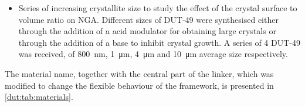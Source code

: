 \begin{itemize}
    \item Series of increasing crystallite size to study the effect 
    of the crystal surface to volume ratio on NGA. Different sizes
    of DUT-49 were synthesised either through the addition of a 
    acid modulator for obtaining large crystals or through the addition
    of a base to inhibit crystal growth. A series of 4 DUT-49 
    was received, of \SI{800}{\nano\metre}, \SI{1}{\micro\metre},
    \SI{4}{\micro\metre} and \SI{10}{\micro\metre} average size 
    respectively.

\end{itemize}


The material name, together with the central part of the linker, 
which was modified to change the flexible behaviour of the framework,
is presented in \autoref{dut:tab:materials}.


